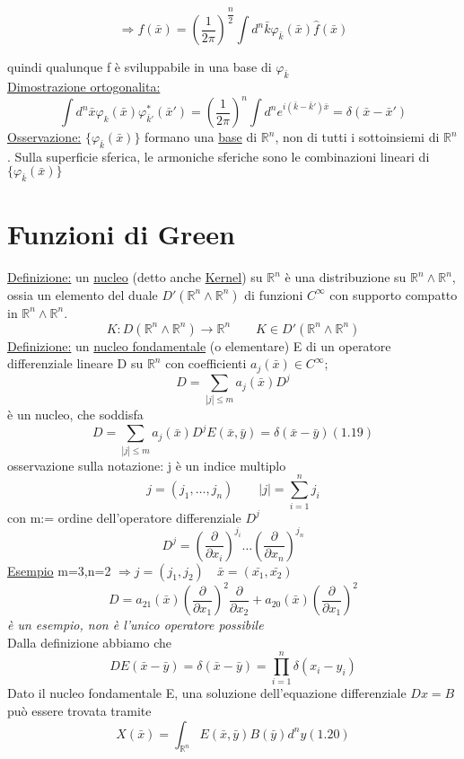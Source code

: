 \documentclass[a4paper,11pt]{report}
\newcommand{\Rn}{\mathbb{R}^n}
\newcommand{\x}{\bar{x}}
\newcommand{\xp}{\bar{x}'}
\newcommand{\y}{\bar{y}}
\newcommand{\kk}{\bar{k}}
\newcommand{\kp}{\bar{k}'}
\begin{document}
$$
\Rightarrow f(\bar{x})=\left(\dfrac{1}{2\pi}\right)^{\dfrac{n}{2}}\int d^n\bar{k}\varphi_{\bar{k}}(\bar{x})\hat{f}(\bar{x})
$$

quindi qualunque f è sviluppabile in una base di $\varphi_{\bar{k}}$\\
\underline{Dimostrazione ortogonalita:}\\
\begin{equation}
\int d^n\x\varphi_{k}(\x)\varphi_{\kp}^{*}(\xp)=\left(\dfrac{1}{2\pi}\right)^{n}\int d^n e^{i(\kk-\kp)\x}=\delta (\x-\xp)
\end{equation}
\underline{Osservazione:} $\{\varphi_{\bar{k}}(\bar{x})\}$ formano una \underline{base} di $\Rn$, non di tutti i sottoinsiemi di $\Rn$. Sulla superficie sferica, le armoniche sferiche sono le combinazioni lineari di $\{\varphi_{\kk}(\x)\}$

\section{Funzioni di Green}
\underline{Definizione:} un \underline{nucleo} (detto anche \underline{Kernel}) su $\Rn$ è una distribuzione su $\Rn \wedge \Rn$, ossia un elemento del duale $D'(\Rn \wedge \Rn)$ di funzioni $C^{\infty}$ con supporto compatto in $\Rn \wedge \Rn$.
$$
K:D(\Rn \wedge \Rn)\rightarrow\Rn \qquad K\in D'(\Rn \wedge \Rn)
$$
\underline{Definizione:} un \underline{nucleo fondamentale} (o elementare) E di un operatore differenziale lineare D su $\Rn$ con coefficienti $a_j(\bar{x})\in C^{\infty}$;
$$
D=\sum_{|j|\leq m}a_j(\bar{x})D^j
$$
è un nucleo, che soddisfa
\begin{equation}
D=\sum_{|j|\leq m}a_j(\bar{x})D^jE(\bar{x},\bar{y})=\delta(\bar{x}-\bar{y}) (1.19)
\end{equation}
osservazione sulla notazione: j è un indice multiplo
$$
j=(j_1,\dots ,j_n) \qquad |j|=\sum_{i=1}^n j_i
$$
con m:= ordine dell'operatore differenziale $D^j$
$$
D^j=\left(\dfrac{\partial}{\partial x_i}\right)^{j_i}\dots \left(\dfrac{\partial}{\partial x_n}\right)^{j_n}
$$
\underline{Esempio} m=3,n=2 $\Rightarrow j=(j_1,j_2) \quad \bar{x}=(\bar{x_1},\bar{x_2})$
$$
D=a_{21}(\bar{x})\left(\dfrac{\partial}{\partial x_1}\right)^2\dfrac{\partial}{\partial x_2}+a_{20}(\bar{x})\left(\dfrac{\partial}{\partial x_1}\right)^2
$$
\emph{è un esempio, non è l'unico operatore possibile}\\
Dalla definizione abbiamo che 
$$
D E(\x-\y)=\delta(\x  - \y)=\prod_{i=1}^{n}\delta(x_i-y_i)
$$
Dato il nucleo fondamentale E, una soluzione dell'equazione differenziale $Dx=B$ può essere trovata tramite
\begin{equation}
X(\x)=\int_{\Rn}E(\x,\y)B(\y)d^ny (1.20)
\end{equation}
\end{document}
